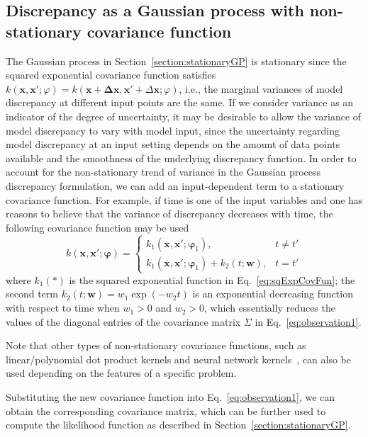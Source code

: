 \documentclass[preprint,review,12pt,3p]{elsarticle}
\begin{document}
\subsection{Discrepancy as a Gaussian process with non-stationary covariance function}\label{section:nonstationaryGP}
The Gaussian process in Section~\ref{section:stationaryGP} is stationary since the squared exponential covariance function satisfies $k(\boldsymbol{x},\boldsymbol{x'};\varphi)=k(\boldsymbol{x+\Delta\boldsymbol{x}},\boldsymbol{x'}+\Delta\boldsymbol{x};\varphi)$, i.e., the marginal variances of model discrepancy at different input points are the same. If we consider variance as an indicator of the degree of uncertainty, it may be desirable to allow the variance of model discrepancy to vary with model input, since the uncertainty regarding model discrepancy at an input setting depends on the amount of data points available and the smoothness of the underlying discrepancy function. In order to account for the non-stationary trend of variance in the Gaussian process discrepancy formulation, we can add an input-dependent term to a stationary covariance function. For example, if time is one of the input variables and one has reasons to believe that the variance of discrepancy decreases with time, the following covariance function may be used 
\begin{equation}\label{eq:nonstationaryCovGP}
k(\boldsymbol{x},\boldsymbol{x'}; \boldsymbol{\varphi}) = 
\begin{cases}
k_1( \boldsymbol{x},\boldsymbol{x'};\boldsymbol{\varphi}_1), & t \ne t'\\
k_1( \boldsymbol{x},\boldsymbol{x'};\boldsymbol{\varphi}_1)+ k_2(t;\boldsymbol{w}), & t = t'
\end{cases}
\end{equation}
where $k_1(*)$ is the squared exponential function in Eq.~\ref{eq:sqExpCovFun}; the second term $k_2(t;\boldsymbol{w})=w_1 \exp(-w_2 t)$ is an exponential decreasing function with respect to time when $w_1>0$ and $w_2>0$, which essentially reduces the values of the diagonal entries of the covariance matrix $\Sigma$ in Eq.~\ref{eq:observation1}. 

Note that other types of non-stationary covariance functions, such as linear/polynomial dot product kernels and neural network kernels~\citep{Rasmussen2006}, can also be used depending on the features of a specific problem.

Substituting the new covariance function into Eq.~\ref{eq:observation1}, we can obtain the corresponding covariance matrix, which can be further used to compute the likelihood function as described in Section~\ref{section:stationaryGP}.
\end{document}
